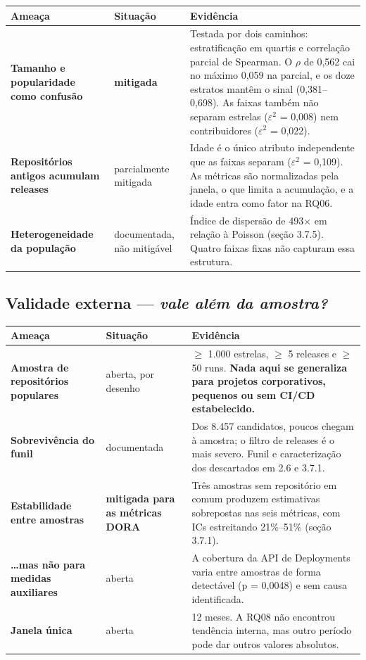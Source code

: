 \documentclass[12pt]{article}
\begin{document}
\begin{table}[!htbp]
\centering
\scriptsize
\begin{tabular}{p{}p{}p{}}
\toprule
\textbf{Ameaça} & \textbf{Situação} & \textbf{Evidência} \\
\midrule
\textbf{Tamanho e popularidade como confusão} & \textbf{mitigada} & Testada por dois caminhos: estratificação em quartis e correlação parcial de Spearman. O $\rho$ de 0,562 cai no máximo 0,059 na parcial, e os doze estratos mantêm o sinal (0,381–0,698). As faixas também não separam estrelas ($\varepsilon$$^2$ = 0,008) nem contribuidores ($\varepsilon$$^2$ = 0,022). \\
\textbf{Repositórios antigos acumulam releases} & parcialmente mitigada & Idade é o único atributo independente que as faixas separam ($\varepsilon$$^2$ = 0,109). As métricas são normalizadas pela janela, o que limita a acumulação, e a idade entra como fator na RQ06. \\
\textbf{Heterogeneidade da população} & documentada, não mitigável & Índice de dispersão de 493$\times$ em relação à Poisson (seção 3.7.5). Quatro faixas fixas não capturam essa estrutura. \\
\bottomrule
\end{tabular}
\end{table}

\subsection{Validade externa — \emph{vale além da amostra?}}

\begin{table}[!htbp]
\centering
\scriptsize
\begin{tabular}{p{}p{}p{}}
\toprule
\textbf{Ameaça} & \textbf{Situação} & \textbf{Evidência} \\
\midrule
\textbf{Amostra de repositórios populares} & aberta, por desenho & $\geq$ 1.000 estrelas, $\geq$ 5 releases e $\geq$ 50 runs. \textbf{Nada aqui se generaliza para projetos corporativos, pequenos ou sem CI/CD estabelecido.} \\
\textbf{Sobrevivência do funil} & documentada & Dos 8.457 candidatos, poucos chegam à amostra; o filtro de releases é o mais severo. Funil e caracterização dos descartados em 2.6 e 3.7.1. \\
\textbf{Estabilidade entre amostras} & \textbf{mitigada para as métricas DORA} & Três amostras sem repositório em comum produzem estimativas sobrepostas nas seis métricas, com ICs estreitando 21\%–51\% (seção 3.7.1). \\
\textbf{\ldots{}mas não para medidas auxiliares} & aberta & A cobertura da API de Deployments varia entre amostras de forma detectável (p = 0,0048) e sem causa identificada. \\
\textbf{Janela única} & aberta & 12 meses. A RQ08 não encontrou tendência interna, mas outro período pode dar outros valores absolutos. \\
\bottomrule
\end{tabular}
\end{table}
\end{document}
